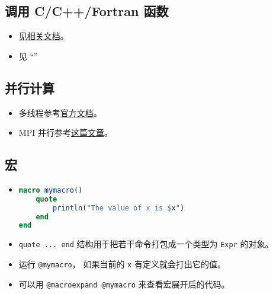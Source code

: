 \subsection{调用 C/C++/Fortran 函数}
\begin{itemize}
\item \href{https://docs.julialang.org/en/v1/manual/calling-c-and-fortran-code/}{见相关文档}。
\item 见 “”
\end{itemize}

\subsection{并行计算}
\begin{itemize}
\item 多线程参考\href{https://docs.julialang.org/en/v1/manual/multi-threading/}{官方文档}。
\item MPI 并行参考\href{http://www.claudiobellei.com/2018/09/30/julia-mpi/}{这篇文章}。
\end{itemize}

\subsection{宏}
\begin{itemize}
\item 
\begin{lstlisting}[language=julia]
macro mymacro()
    quote
        println("The value of x is $x")
    end
end
\end{lstlisting}
\item \verb`quote ... end` 结构用于把若干命令打包成一个类型为 \verb`Expr` 的对象。
\item 运行 \verb`@mymacro`， 如果当前的 \verb`x` 有定义就会打出它的值。
\item 可以用 \verb`@macroexpand @mymacro` 来查看宏展开后的代码。
\end{itemize}


